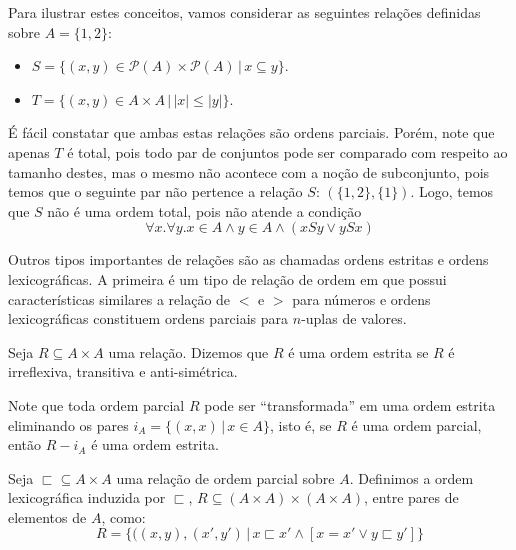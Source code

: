 \begin{Example}
Para ilustrar estes conceitos, vamos considerar as seguintes relações
definidas sobre $A = \{1,2\}$:
\begin{itemize}
  \item $S = \{(x,y)\in\mathcal{P}(A)\times\mathcal{P}(A)\,|\,x
    \subseteq y\}$.
  \item $T = \{(x,y)\in A \times A\,|\,|x| \leq |y|\}$.
\end{itemize}
É fácil constatar que ambas estas relações são ordens parciais. Porém,
note que apenas $T$ é total, pois todo par de conjuntos pode ser
comparado com respeito ao tamanho destes, mas o mesmo não acontece com
a noção de subconjunto, pois temos que o seguinte par não pertence a
relação $S$: $(\{1,2\},\{1\})$. Logo, temos que $S$ não é uma ordem
total, pois não atende a condição
\[
\forall x. \forall y. x\in A \land y \in A \land (xSy \lor ySx)
\]
\end{Example}

Outros tipos importantes de relações são as chamadas ordens estritas
e ordens lexicográficas. A primeira é um tipo de relação de ordem em
que possui características similares a relação de $<$ e $>$ para
números e ordens lexicográficas constituem ordens parciais para
$n$-uplas de valores.

\begin{Definition}
Seja $R \subseteq A \times A$ uma relação. Dizemos que $R$ é uma ordem
estrita se $R$ é irreflexiva, transitiva e anti-simétrica.
\end{Definition}

Note que toda ordem parcial $R$ pode ser ``transformada'' em uma ordem
estrita eliminando os pares $i_{A}=\{(x,x)\,|\,x\in A\}$, isto é, se
$R$ é uma ordem parcial, então $R - i_A$ é uma ordem estrita.

\begin{Definition}\label{lexorder}
Seja $\sqsubset \subseteq A \times A$ uma relação de ordem parcial
sobre $A$. Definimos a ordem lexicográfica induzida por $\sqsubset$,
$R \subseteq (A \times A) \times (A \times A)$, entre pares de
elementos de $A$, como:
\[
R = \{((x,y),(x',y')\,|\,x\sqsubset x' \land [x = x' \lor y \sqsubset y']\}
\]
\end{Definition}
